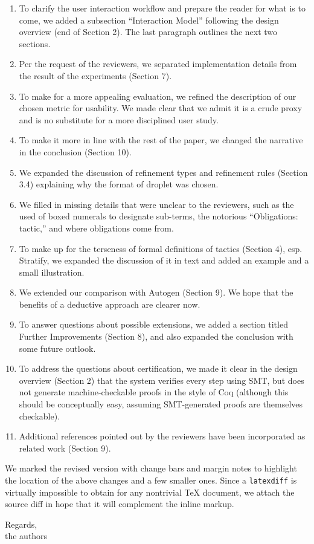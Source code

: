 \documentclass{article}
\begin{document}
\begin{enumerate}
  \item To clarify the user interaction workflow and prepare the reader
    for what is to come, we added a subsection ``Interaction Model''
    following the design overview (end of Section 2).
    The last paragraph outlines the next two sections.
  \item Per the request of the reviewers, we separated implementation details
    from the result of the experiments (Section 7).
  \item To make for a more appealing evaluation, we refined the description
    of our chosen metric for usability. We made clear that we admit it is
    a crude proxy and is no substitute for a more disciplined user study.
  \item To make it more in line with the rest of the paper, we changed
    the narrative in the conclusion (Section 10).
  \item We expanded the discussion of refinement types and refinement rules
    (Section 3.4) explaining why the format of droplet was chosen.
  \item We filled in missing details that were unclear to the reviewers,
    such as the used of boxed numerals to designate sub-terms, the notorious
    ``Obligations: tactic,'' and where obligations come from.
  \item To make up for the terseness of formal definitions of tactics (Section 4),
    esp. \textsf{Stratify}, we expanded the discussion of it in text and
    added an example and a small illustration.
  \item We extended our comparison with Autogen (Section 9). We hope that
    the benefits of a deductive approach are clearer now.
  \item To answer questions about possible extensions, we added a section
    titled Further Improvements (Section 8), and also expanded the conclusion
    with some future outlook.
  \item To address the questions about certification, we made it clear in the
    design overview (Section 2) that the system verifies every step using SMT,
    but does not generate machine-checkable proofs in the style of Coq
    (although this should be conceptually easy, assuming SMT-generated proofs are themselves checkable).
  \item Additional references pointed out by the reviewers have been incorporated as
    related work (Section 9).
\end{enumerate}

We marked the revised version with change bars and margin notes to highlight
the location of the above changes and a few smaller ones.
Since a \texttt{latexdiff} is virtually impossible to obtain for any nontrivial \TeX{} document,
we attach the source diff in hope that it will complement the inline markup.

\bigskip\noindent
Regards,\\
the authors
\end{document}
